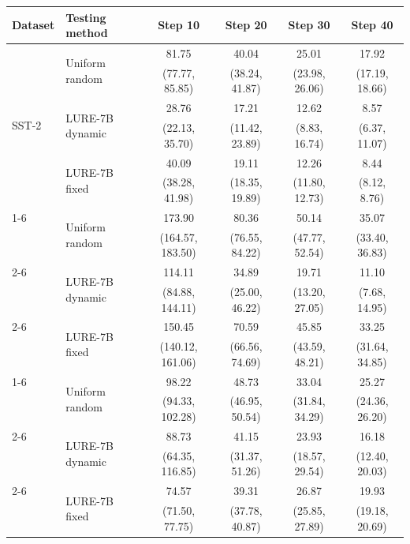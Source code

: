 \begin{table}[h]
    \centering
    \small
    \begin{tabular}{l l c c c c}
        \toprule
        Dataset & Testing method & Step 10 & Step 20 & Step 30 & Step 40 \\
        \midrule
        \multirow{6}{*}{SST-2}& \multirow{2}{*}{Uniform random} & 81.75 &	40.04 &	25.01 &	17.92 \\
        &&(77.77, 85.85) & (38.24, 41.87) & (23.98, 26.06) & (17.19, 18.66) \\
        \cline{2-6}
        & \multirow{2}{*}{LURE-7B dynamic} & 28.76 &	17.21 &	12.62 &	8.57 \\
        &&(22.13, 35.70) &(11.42, 23.89) &(8.83, 16.74) &(6.37, 11.07) \\
        \cline{2-6}
        & \multirow{2}{*}{LURE-7B fixed} & 40.09&	19.11 &	12.26&	8.44 \\
        && (38.28, 41.98) &(18.35, 19.89) & (11.80, 12.73) &(8.12, 8.76) \\
        \cline{1-6}
        \multirow{6}{*}{FPB}& \multirow{2}{*}{Uniform random} & 173.90 &	80.36 &	50.14 &	35.07 \\
        &&(164.57, 183.50) &(76.55, 84.22) &(47.77, 52.54) &(33.40, 36.83) \\
        \cline{2-6}
        & \multirow{2}{*}{LURE-7B dynamic} & 114.11 &	34.89 &	19.71 &	11.10 \\
        &&(84.88, 144.11) &(25.00, 46.22) &(13.20, 27.05) &(7.68, 14.95) \\
        \cline{2-6}
        & \multirow{2}{*}{LURE-7B fixed} & 150.45 &	70.59 &	45.85 &	33.25 \\
        &&(140.12, 161.06) &(66.56, 74.69) &(43.59, 48.21) &(31.64, 34.85) \\
        \cline{1-6}
        \multirow{6}{*}{HS}& \multirow{2}{*}{Uniform random} & 98.22 &	48.73 &	33.04 &	25.27 \\
        &&(94.33, 102.28) & (46.95, 50.54) &(31.84, 34.29) &(24.36, 26.20) \\
        \cline{2-6}
        & \multirow{2}{*}{LURE-7B dynamic} & 88.73 &	41.15 &	23.93 &	16.18 \\
        &&(64.35, 116.85) &(31.37, 51.26) &(18.57, 29.54) &(12.40, 20.03) \\
        \cline{2-6}
        & \multirow{2}{*}{LURE-7B fixed} & 74.57 &	39.31 &	26.87 &	19.93 \\
        &&(71.50, 77.75) &(37.78, 40.87) &(25.85, 27.89) &(19.18, 20.69) \\

\end{tabular}
\end{table}

